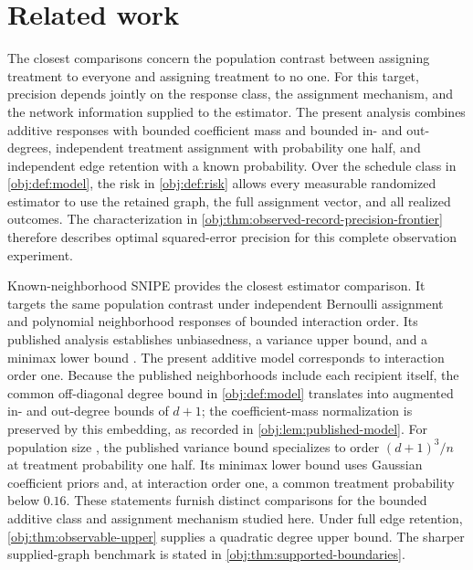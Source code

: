 \section{Related work}

The closest comparisons concern the population contrast between assigning treatment to everyone and assigning treatment to no one. For this target, precision depends jointly on the response class, the assignment mechanism, and the network information supplied to the estimator. The present analysis combines additive responses with bounded coefficient mass and bounded in- and out-degrees, independent treatment assignment with probability one half, and independent edge retention with a known probability. Over the schedule class in \cref{obj:def:model}, the risk in \cref{obj:def:risk} allows every measurable randomized estimator to use the retained graph, the full assignment vector, and all realized outcomes. The characterization in \cref{obj:thm:observed-record-precision-frontier} therefore describes optimal squared-error precision for this complete observation experiment.

Known-neighborhood SNIPE provides the closest estimator comparison. It targets the same population contrast under independent Bernoulli assignment and polynomial neighborhood responses of bounded interaction order. Its published analysis establishes unbiasedness, a variance upper bound, and a minimax lower bound \citep[Sections 3--5; Theorems 1--2]{CortezRodriguezEichhornYu2023SNIPE}. The present additive model corresponds to interaction order one. Because the published neighborhoods include each recipient itself, the common off-diagonal degree bound  in \cref{obj:def:model} translates into augmented in- and out-degree bounds of \(d+1\); the coefficient-mass normalization is preserved by this embedding, as recorded in \cref{obj:lem:published-model}. For population size , the published variance bound specializes to order \((d+1)^3/n\) at treatment probability one half. Its minimax lower bound uses Gaussian coefficient priors and, at interaction order one, a common treatment probability below \(0.16\). These statements furnish distinct comparisons for the bounded additive class and assignment mechanism studied here. Under full edge retention, \cref{obj:thm:observable-upper} supplies a quadratic degree upper bound. The sharper supplied-graph benchmark is stated in \cref{obj:thm:supported-boundaries}.

